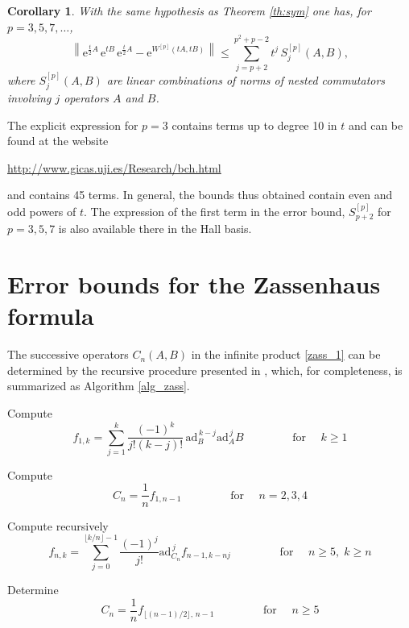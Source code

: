 \documentclass[11pt]{article}
\newcommand{\e}{\ensuremath{\mathrm{e}}}
\newcommand{\ad}{\ensuremath{\mathrm{ad}}}
\newtheorem{corollary}[theorem]{Corollary}
\begin{document}
\begin{corollary}
With the same hypothesis as Theorem \ref{th:sym} one has, for $p = 3,5,7, \ldots$,
\[
   \left\| \e^{\frac{t}{2} A} \, \e^{t B} \,  \e^{\frac{t}{2} A} - \e^{W^{[p]}(tA,tB)} \right\|  \le  \sum_{j=p+2}^{p^2 +p -2} t^j \, S_j^{[p]}(A,B),
\]
where $S_j^{[p]}(A,B)$ are linear combinations of norms of nested commutators involving $j$ operators $A$ and $B$.
\end{corollary}

The explicit expression for $p=3$ contains terms up to degree 10 in $t$ and can be found at the website 
\begin{center}
  \url{http://www.gicas.uji.es/Research/bch.html}
\end{center}  
and contains 45 terms. In general, the bounds thus obtained contain even and odd
powers of $t$. The expression of the first term in the error bound, $S_{p+2}^{[p]}$ for $p=3,5,7$ is also available there in the Hall basis.


\section{Error bounds for the Zassenhaus formula} 
 
 The successive operators $C_n(A,B)$ in the infinite product \eqref{zass_1} can be determined by the recursive procedure presented in \cite{casas12eco},
 which, for completeness, is summarized as Algorithm \ref{alg_zass}.
 
\begin{algorithm}
\caption{Computation of the coefficients $C_n$ in the Zassenhaus formula}\label{alg_zass}
\begin{algorithmic}[1]

\State Compute
\[
f_{1,k} =
\sum_{j=1}^{k}
\frac{(-1)^k}{j!(k-j)!}
\,\ad_B^{\,k-j}\ad_A^{\,j} B \qquad\qquad \mbox{ for } \quad k \ge 1
\]

\State Compute
\[
C_n = \frac{1}{n} f_{1,n-1} \qquad\qquad \mbox{ for } \quad n=2,3,4
\]


\State Compute recursively
\[
f_{n,k}=
\sum_{j=0}^{\lfloor k/n \rfloor -1}
\frac{(-1)^j}{j!}
\ad_{C_n}^{\,j}
f_{n-1,k-nj} \qquad\qquad \mbox{ for } \quad n \ge 5, \; k \ge n
\]

\State Determine
\[
C_n =
\frac{1}{n}
f_{\lfloor (n-1)/2 \rfloor ,\,n-1} \qquad\qquad \mbox{ for } \quad n \ge 5
\]

\end{algorithmic}
\end{algorithm}
\end{document}
